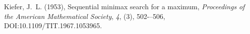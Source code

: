 \documentclass[letterpaper,twoside,12pt]{article}
\begin{document}
\begin{thebibliography}{99}

{Kiefer}, J.~L. (1953), {Sequential minimax search for a maximum}, \textit{Proceedings of the American Mathematical Society}, \textit{4}, (3), 502-–506, DOI:10.1109/TIT.1967.1053965.

%
%
%
%
%
%
%
%
%
%


\end{thebibliography}
\end{document}
